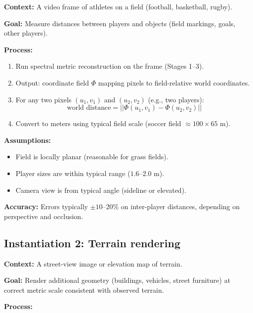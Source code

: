 \documentclass[11pt,twocolumn,a4paper]{article}
\theoremstyle{definition}
\begin{document}
\textbf{Context:} A video frame of athletes on a field (football, basketball, rugby).

\textbf{Goal:} Measure distances between players and objects (field markings, goals, other players).

\textbf{Process:}

\begin{enumerate}[leftmargin=1.4em]
  \item Run spectral metric reconstruction on the frame (Stages 1--3).
  \item Output: coordinate field $\Phi$ mapping pixels to field-relative world coordinates.
  \item For any two pixels $(u_1, v_1)$ and $(u_2, v_2)$ (e.g., two players):
    \begin{equation}
    \text{world distance} = ||\Phi(u_1, v_1) - \Phi(u_2, v_2)||
    \end{equation}
  \item Convert to meters using typical field scale (soccer field $\approx 100 \times 65$ m).
\end{enumerate}

\textbf{Assumptions:}
\begin{itemize}
  \item Field is locally planar (reasonable for grass fields).
  \item Player sizes are within typical range ($1.6$--$2.0$ m).
  \item Camera view is from typical angle (sideline or elevated).
\end{itemize}

\textbf{Accuracy:} Errors typically $\pm 10$--$20\%$ on inter-player distances, depending on perspective and occlusion.

\subsection{Instantiation 2: Terrain rendering}

\textbf{Context:} A street-view image or elevation map of terrain.

\textbf{Goal:} Render additional geometry (buildings, vehicles, street furniture) at correct metric scale consistent with observed terrain.

\textbf{Process:}
\end{document}
